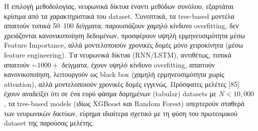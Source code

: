 Η επιλογή μεθοδολογίας, νευρωνικά δίκτυα έναντι μεθόδων συνόλου, εξαρτάται κρίσιμα από τα χαρακτηριστικά του dataset. Συνοπτικά, τα tree-based μοντέλα απαιτούν τυπικά 50--100 δείγματα, παρουσιάζουν χαμηλό κίνδυνο overfitting, δεν χρειάζονται κανονικοποίηση δεδομένων, προσφέρουν υψηλή ερμηνευσιμότητα μέσω Feature Importance, αλλά μοντελοποιούν χρονικές δομές μόνο χειροκίνητα (μέσω feature engineering). Τα νευρωνικά δίκτυα (RNN/LSTM), αντιθέτως, τυπικά απαιτούν $\sim 1000+$ δείγματα, έχουν υψηλό κίνδυνο overfitting, απαιτούν κανονικοποίηση, λειτουργούν ως black box (χαμηλή ερμηνευσιμότητα χωρίς attention), αλλά μοντελοποιούν χρονικές δομές εγγενώς. Πρόσφατες μελέτες [85] έχουν αναδείξει ότι σε ένα ευρύ φάσμα δομημένων (tabular) datasets με $N < 10{,}000$, τα tree-based models (ιδίως XGBoost και Random Forest) υπερτερούν σταθερά των νευρωνικών δικτύων, εύρημα ιδιαίτερα σχετικό με τη φύση του πρωτεομικού dataset της παρούσας μελέτης.

